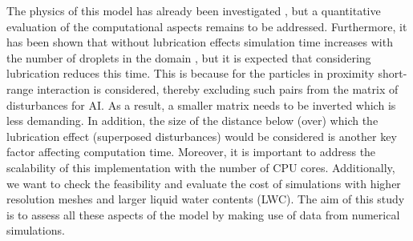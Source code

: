 \documentclass[../thesis.tex]{subfiles}
\begin{document}
The physics of this model has already been investigated \cite{ARPW21}, but a quantitative evaluation of the computational aspects remains to be addressed. Furthermore, it has been shown that without lubrication effects simulation time increases with the number of droplets in the domain \cite{APCRW14}, but it is expected that considering lubrication reduces this time. This is because for the particles in proximity short-range interaction is considered, thereby excluding such pairs from the matrix of disturbances for AI. As a result, a smaller matrix needs to be inverted which is less demanding. In addition, the size of the distance below (over) which the lubrication effect (superposed disturbances) would be considered is another key factor affecting computation time. Moreover, it is important to address the scalability of this implementation with the number of CPU cores. Additionally, we want to check the feasibility and evaluate the cost of simulations with higher resolution meshes and larger liquid water contents (LWC). The aim of this study is to assess all these aspects of the model by making use of data from numerical simulations.
\end{document}
